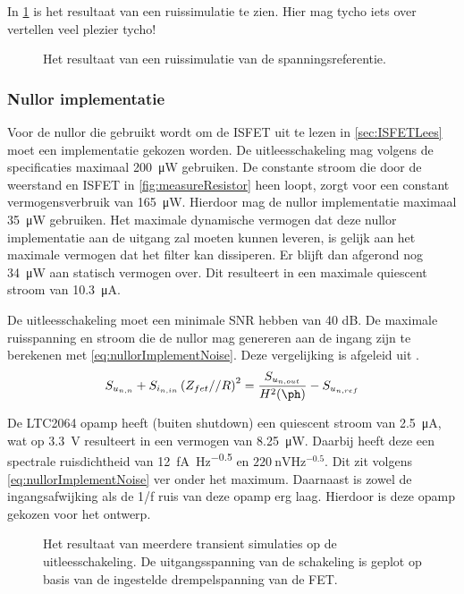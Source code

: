 In \cref{fig:referenceSimNoise} is het resultaat van een ruissimulatie te zien. Hier mag tycho iets over vertellen veel plezier tycho!%
\begin{figure}[!htbp]
    \centering
    \pgfplotsset{width=0.7\textwidth}
    
    \caption{Het resultaat van een ruissimulatie van de spanningsreferentie.}
    \label{fig:referenceSimNoise}
\end{figure}


\subsubsection{Nullor implementatie}
Voor de nullor die gebruikt wordt om de ISFET uit te lezen in \cref{sec:ISFETLees} moet een implementatie gekozen worden. De uitleesschakeling mag volgens de specificaties maximaal \qty{200}{\micro\watt}  gebruiken. De constante stroom die door de weerstand en ISFET in \cref{fig:measureResistor} heen loopt, zorgt voor een constant vermogensverbruik van \qty{165}{\micro\watt}. Hierdoor mag de nullor implementatie maximaal \qty{35}{\micro\watt} gebruiken. Het maximale dynamische vermogen dat deze nullor implementatie aan de uitgang zal moeten kunnen leveren, is gelijk aan het maximale vermogen dat het filter kan dissiperen. Er blijft dan afgerond nog \qty{34}{\micro\watt} aan statisch vermogen over. Dit resulteert in een maximale quiescent stroom van \qty{10.3}{\micro\ampere}.

De uitleesschakeling moet een minimale SNR hebben van 40 dB. De maximale ruisspanning en stroom die de nullor mag genereren aan de ingang zijn te berekenen met \cref{eq:nullorImplementNoise}. Deze vergelijking is afgeleid uit .
\begin{equation} \label{eq:nullorImplementNoise}
    S_{u_{{n,n}}} + S_{i_{{n,in}}}\left(Z_{fet} // R\right)^2 = \frac{S_{u_{{n,out}}}}{H^2(\ph)} - S_{u_{{n,ref}}}
\end{equation}

De LTC2064 opamp heeft (buiten shutdown) een quiescent stroom van \qty{2.5}{\micro\ampere}, wat op \qty{3.3}{\volt} resulteert in een vermogen van \qty{8.25}{\micro\watt}. Daarbij heeft deze een spectrale ruisdichtheid van \qty{12}{\femto\ampere\hertz^{-0.5}} en $\qty{220}{\nano\volt\hertz^{-0.5}}$\cite{LTC2064}. Dit zit volgens \cref{eq:nullorImplementNoise} ver onder het maximum. Daarnaast is zowel de ingangsafwijking als de 1/f ruis van deze opamp erg laag. Hierdoor is deze opamp gekozen voor het ontwerp.


\begin{figure}[!htbp]
    \centering
    \pgfplotsset{width=0.7\textwidth}
    
    \caption{Het resultaat van meerdere transient simulaties op de uitleesschakeling. De uitgangsspanning van de schakeling is geplot op basis van de ingestelde drempelspanning van de FET.}
    \label{fig:readoutSimTrans}
\end{figure}